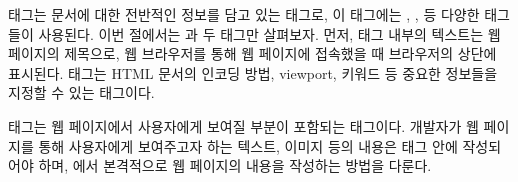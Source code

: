  태그는 문서에 대한 전반적인 정보를 담고 있는 태그로, 이 태그에는 , ,  등 다양한 태그들이 사용된다. 이번 절에서는 과  두 태그만 살펴보자. 먼저,  태그 내부의 텍스트는 웹 페이지의 제목으로, 웹 브라우저를 통해 웹 페이지에 접속했을 때 브라우저의 상단에 표시된다.  태그는 HTML 문서의 인코딩 방법, viewport, 키워드 등 중요한 정보들을 지정할 수 있는 태그이다.

 태그는 웹 페이지에서 사용자에게 보여질 부분이 포함되는 태그이다. 개발자가 웹 페이지를 통해 사용자에게 보여주고자 하는 텍스트, 이미지 등의 내용은  태그 안에 작성되어야 하며, 에서 본격적으로 웹 페이지의 내용을 작성하는 방법을 다룬다.
